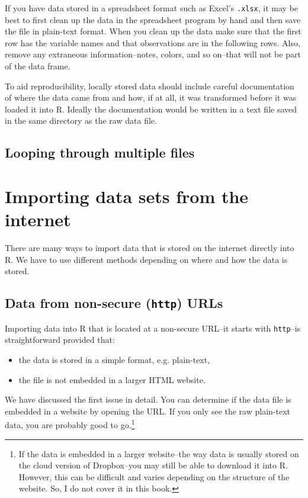 If you have data stored in a spreadsheet format such as Excel's \texttt{.xlsx}, it may be best to first clean up the data in the spreadsheet program by hand and then save the file in plain-text format. When you clean up the data make sure that the first row has the variable names and that observations are in the following rows. Also, remove any extraneous information--notes, colors, and so on--that will not be part of the data frame.

To aid reproducibility, locally stored data should include careful documentation of where the data came from and how, if at all, it was transformed before it was loaded it into R. Ideally the documentation would be written in a text file saved in the same directory as the raw data file. 

\subsection{Looping through multiple files}


\section{Importing data sets from the internet}

There are many ways to import data that is stored on the internet directly into R. We have to use different methods depending on where and how the data is stored. 

\subsection{Data from non-secure ({\tt{http}}) URLs}

Importing data into R that is located at a non-secure URL--it starts with {\tt{http}}--is straightforward provided that:

\begin{itemize}
    \item the data is stored in a simple format, e.g. plain-text,
    \item the file is not embedded in a larger HTML website.
\end{itemize}

We have discussed the first issue in detail. You can determine if the data file is embedded in a website by opening the URL. If you only see the raw plain-text data, you are probably good to go.\footnote{If the data is embedded in a larger website--the way data is usually stored on the cloud version of Dropbox--you may still be able to download it into R. However, this can be difficult and varies depending on the structure of the website. So, I do not cover it in this book.}


